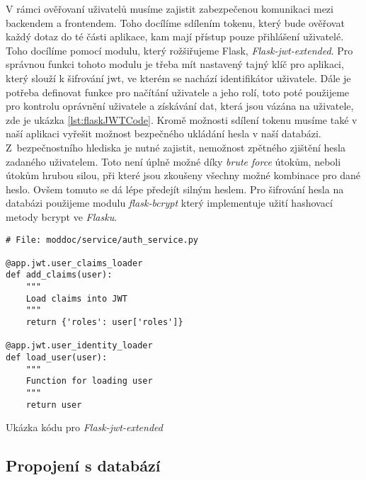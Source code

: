 V rámci ověřovaní uživatelů musíme zajistit zabezpečenou komunikaci mezi backendem a frontendem. Toho docílíme sdílením tokenu, který bude ověřovat
každý dotaz do té části aplikace, kam mají přístup pouze přihlášení uživatelé. Toho docílíme pomocí modulu, který rožšiřujeme Flask,
\textit{Flask-jwt-extended}. Pro správnou funkci tohoto modulu je třeba mít nastavený tajný klíč pro aplikaci, který slouží k šifrování \gls{jwt},
ve kterém se nachází identifikátor uživatele. Dále je potřeba definovat funkce pro načítání uživatele a jeho rolí, toto poté použijeme pro kontrolu
oprávnění uživatele a získávání dat, která jsou vázána na uživatele, zde je ukázka \ref{lst:flaskJWTCode}. Kromě možnosti sdílení tokenu musíme
také v naší aplikaci vyřešit možnost bezpečného ukládání hesla v naší databázi. Z~bezpečnostního hlediska je nutné zajistit, nemožnost zpětného
zjištění hesla zadaného uživatelem. Toto není úplně možné díky \textit{brute force} útokům, neboli útokům hrubou silou, při které jsou zkoušeny
všechny možné kombinace pro dané heslo. Ovšem tomuto se dá lépe předejít silným heslem. Pro šifrování hesla na databázi použijeme modulu \textit{flask-bcrypt}
který implementuje užití hashovací metody bcrypt ve \textit{Flasku}.

\begin{listing}[H]
    \begin{verbatim}
# File: moddoc/service/auth_service.py

@app.jwt.user_claims_loader
def add_claims(user):
    """
    Load claims into JWT
    """
    return {'roles': user['roles']}

@app.jwt.user_identity_loader
def load_user(user):
    """
    Function for loading user
    """
    return user
    \end{verbatim}
    \caption{Ukázka kódu pro \textit{Flask-jwt-extended}}
    \label{lst:flaskJWTCode}
\end{listing}

\subsection{Propojení s databází}

